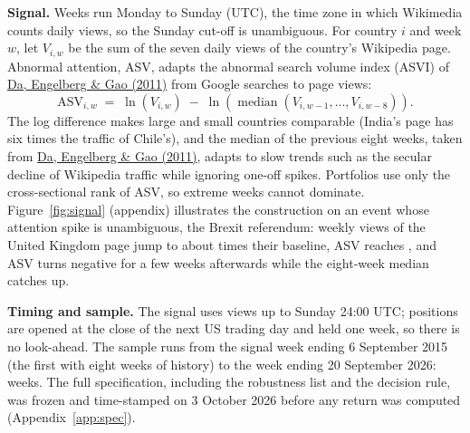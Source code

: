 \documentclass[11pt,a4paper]{article}
\DeclareRobustCommand{\refto}[2]{\hyperlink{ref:#1}{#2}}
\begin{document}
\textbf{Signal.} Weeks run Monday to Sunday (UTC), the time zone in which Wikimedia counts daily
views, so the Sunday cut-off is unambiguous. For country $i$ and week $w$, let $V_{i,w}$
be the sum of the seven daily views of the country's Wikipedia page. Abnormal attention, ASV, adapts the abnormal search volume index (ASVI) of
\refto{da2011}{Da, Engelberg \& Gao (2011)} from Google searches to page views:
\begin{equation*}
  \mathrm{ASV}_{i,w} \;=\; \ln\left(V_{i,w}\right) \;-\; \ln\left(\operatorname{median}\left(V_{i,w-1},\dots,V_{i,w-8}\right)\right).
\end{equation*}
The log difference makes large and small countries comparable (India's page has six times the
traffic of Chile's), and the median of the previous eight weeks, taken from \refto{da2011}{Da, Engelberg \& Gao
(2011)}, adapts to slow trends such as the secular decline of Wikipedia traffic while ignoring
one-off spikes. Portfolios use only the cross-sectional rank of ASV, so extreme weeks cannot
dominate. Figure~\ref{fig:signal} (appendix) illustrates the construction on an event whose attention
spike is unambiguous, the Brexit referendum: weekly views of the United Kingdom page jump to about
\BrexitRatio{} times their baseline, ASV reaches \BrexitASV{}, and ASV turns negative for a few weeks
afterwards while the eight-week median catches up.

\textbf{Timing and sample.} The signal uses views up to Sunday 24:00 UTC; positions are opened
at the close of the next US trading day and held one week, so there is no look-ahead. The sample
runs from the signal week ending 6 September 2015 (the first with eight weeks of history) to the
week ending 20 September 2026: \NWeeks{} weeks. The full specification, including the robustness
list and the decision rule, was frozen and time-stamped on 3 October 2026 before any return was
computed (Appendix~\ref{app:spec}).

\end{document}

